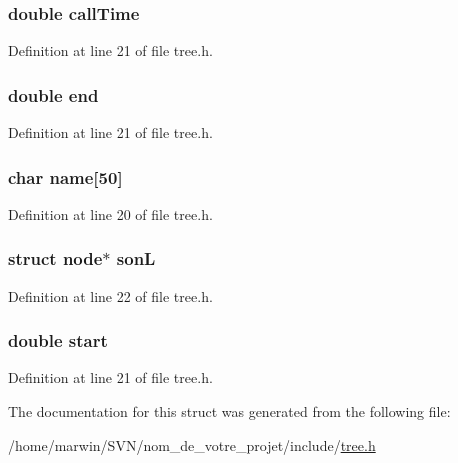 \hypertarget{structnode_ae9d5b3daa2a3e10c61e3de2c31021246}{
\subsubsection[{call\-Time}]{\setlength{\rightskip}{0pt plus 5cm}double call\-Time}}\label{structnode_ae9d5b3daa2a3e10c61e3de2c31021246}


Definition at line 21 of file tree.\-h.

\hypertarget{structnode_a2c6c1302fc577e5e226869e3b899043e}{
\subsubsection[{end}]{\setlength{\rightskip}{0pt plus 5cm}double end}}\label{structnode_a2c6c1302fc577e5e226869e3b899043e}


Definition at line 21 of file tree.\-h.

\hypertarget{structnode_ae5cb967283dbbdf75cb2032c1fa08fee}{
\subsubsection[{name}]{\setlength{\rightskip}{0pt plus 5cm}char name\mbox{[}50\mbox{]}}}\label{structnode_ae5cb967283dbbdf75cb2032c1fa08fee}


Definition at line 20 of file tree.\-h.

\hypertarget{structnode_a814872150cee74a97437edbe9d872806}{
\subsubsection[{son\-L}]{\setlength{\rightskip}{0pt plus 5cm}struct {\bf node}$\ast$ son\-L}}\label{structnode_a814872150cee74a97437edbe9d872806}


Definition at line 22 of file tree.\-h.

\hypertarget{structnode_a45314566a84a31f43e6435d1eb24d4ec}{
\subsubsection[{start}]{\setlength{\rightskip}{0pt plus 5cm}double start}}\label{structnode_a45314566a84a31f43e6435d1eb24d4ec}


Definition at line 21 of file tree.\-h.



The documentation for this struct was generated from the following file\-:\begin{DoxyCompactItemize}
\item 
/home/marwin/\-S\-V\-N/nom\-\_\-de\-\_\-votre\-\_\-projet/include/\hyperlink{tree_8h}{tree.\-h}\end{DoxyCompactItemize}
